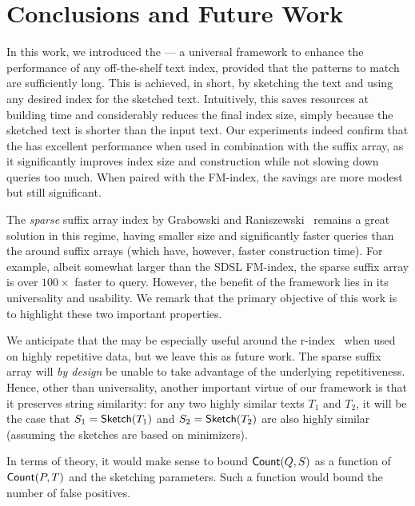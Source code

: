 \section{Conclusions and Future Work}\label{sec:conclusions}

In this work, we introduced the {\uindex} --- a universal framework to enhance the performance of any off-the-shelf text index, provided that the patterns to match are sufficiently long.
This is achieved, in short, by sketching the text and using any desired index
for the sketched text.
Intuitively, this saves resources at building time and considerably reduces the
final index size, simply
because the sketched text is shorter than the input text.
Our experiments indeed confirm that the \uindex 
has excellent performance when used in combination with the suffix array, as
it significantly improves index size and construction while not slowing down queries too much. When paired with the FM-index, the savings are more modest but still significant.

The \textit{sparse} suffix array index by Grabowski and Raniszewski~\cite{DBLP:journals/spe/GrabowskiR17} remains a great solution in
this regime, having smaller size and significantly faster queries than the
\uindex around suffix arrays (which have, however, faster construction time).
For example, albeit somewhat larger than the SDSL FM-index, the sparse suffix array is over $100\times$ faster to query.
However, the benefit of the {\uindex} framework lies in its universality and usability.
We remark that the primary objective of this work is to highlight
these two important properties.

We anticipate that the \uindex may be especially useful around the r-index~\cite{10.1145/3375890} when used on highly repetitive data,
but we leave this as future work.
The sparse suffix array will \emph{by design} be unable to take advantage of the underlying repetitiveness. Hence, other than universality, another important virtue of our framework is that it preserves string similarity: for any two highly similar texts $T_1$ and $T_2$, it will be the case that $S_1=\textup{\textsf{Sketch}}(T_1)$ and $S_2=\textup{\textsf{Sketch}}(T_2)$ are also highly similar (assuming the sketches are based on minimizers).

In terms of theory, it would make sense to bound
$\textup{\textsf{Count}}(Q,S)$ as a function of $\textup{\textsf{Count}}(P,T)$ and the sketching parameters.
Such a function would bound the number of false positives.
